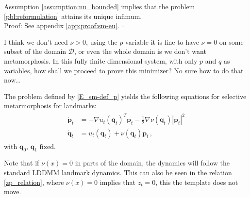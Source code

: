 \documentclass[runningheads]{llncs}
\begin{document}
\begin{theorem}\label{sm-eu}
Assumption \ref{assumption:nu_bounded} implies that the problem
\eqref{pbl:reformulation} attains its unique infimum.\\

Proof: See appendix \ref{app:proof:sm-eu}.
{\hfill $\square$}
\end{theorem}
{\color{red} I think we don't need $\nu>0$, using the $p$ variable it is fine to have $\nu=0$ on some subset of the domain $\mathcal D$, or even the whole domain is we don't want metamorphosis. 
In this fully finite dimensional system, with only $p$ and $q$ as variables, how shall we proceed to prove this minimizer? No sure how to do that now\dots
}

The problem defined by \eqref{E_sm-def_p} yields the following equations for
selective metarmorphosis for landmarks:
\begin{align}
  \begin{split}
  \dot{\mathbf p}_t &= - \nabla u_t(\mathbf q_t)^T \mathbf p_t - \frac12
  \nabla \nu(\mathbf q_t ) |\mathbf p_t|^2\\ \dot{\mathbf q}_t &= u_t(\mathbf q_t) +
  \nu(\mathbf q_t)\mathbf p_t \,,
\end{split}
  \label{eq-m-selective}
\end{align}
with $\mathbf q_0,\, \mathbf q_1 \text{ fixed}$.

Note that if $\nu(x)=0$ in parts of the domain, the dynamics will follow
the standard LDDMM landmark dynamics. This can also be seen in the relation 
\eqref{zp_relation}, where $\nu(x)=0$  implies that $z_t=0$, this the template
does not move. 
\end{document}
